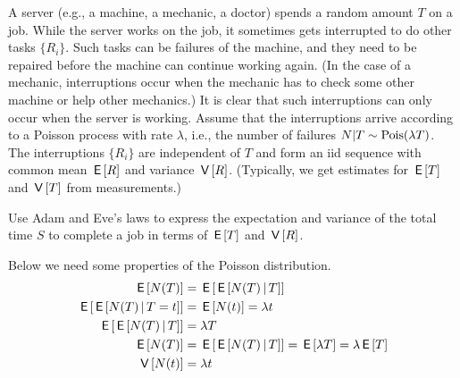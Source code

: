 \begin{exercise}
A server (e.g., a machine, a mechanic, a doctor) spends a random amount $T$ on a job.
While the server works on the job, it sometimes gets interrupted to do other tasks $\{R_{i}\}$.
Such tasks can be failures of the machine, and they need to be repaired before the machine can continue working again.
(In the case of a mechanic, interruptions occur when the mechanic has to check some other machine or help other mechanics.)
It is clear that such interruptions can only occur when the server is working.
Assume that the interruptions arrive according to a Poisson process with rate $\lambda$, i.e., the number of failures $N| T \sim\mathrm{Pois}(\lambda T)$.
The interruptions $\{R_{i}\}$ are independent of $T$ and form an iid sequence with common mean $\,\mathsf{E}\left[R\right]$ and variance $\,\mathsf{V}\left[R\right]$.
(Typically, we get estimates for $\,\mathsf{E}\left[T\right]$ and $\,\mathsf{V}\left[T\right]$ from measurements.)

Use Adam and Eve's laws to express the expectation and variance of the total time $S$ to complete a job in terms of $\,\mathsf{E}\left[T\right]$ and $\,\mathsf{V}\left[R\right]$.
\begin{solution}

Below we need some properties of the Poisson distribution.
\begin{align}
\,\mathsf{E}\left[N(T)\right] &= \,\mathsf{E}\left[\,\mathsf{E}\left[N(T)\,\middle|\, T\right]\right]\\
\,\mathsf{E}\left[\,\mathsf{E}\left[N(T)\,\middle|\, T=t\right]\right]&= \,\mathsf{E}\left[N(t)\right] = \lambda t \\
\,\mathsf{E}\left[\,\mathsf{E}\left[N(T)\,\middle|\, T\right]\right]&= \lambda T \\
\,\mathsf{E}\left[N(T)\right] &= \,\mathsf{E}\left[\,\mathsf{E}\left[N(T)\,\middle|\, T\right]\right] = \,\mathsf{E}\left[\lambda T\right] = \lambda \,\mathsf{E}\left[T\right]\\
\,\mathsf{V}\left[N(t)\right] &= \lambda t
\end{align}


\end{solution}
\end{exercise}
